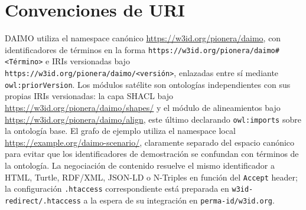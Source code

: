 \documentclass[11pt,a4paper]{article}
\newcommand{\code}[1]{\texttt{#1}}
\begin{document}
\section{Convenciones de URI}\label{app:uris}

DAIMO utiliza el namespace canónico \url{https://w3id.org/pionera/daimo}, con identificadores de términos en la forma \texttt{https://w3id.org/pionera/daimo\#<Término>} e IRIs versionadas bajo \texttt{https://w3id.org/pionera/daimo/<versión>}, enlazadas entre sí mediante \code{owl:priorVersion}. Los módulos satélite son ontologías independientes con sus propias IRIs versionadas: la capa SHACL bajo \url{https://w3id.org/pionera/daimo/shapes/} y el módulo de alineamientos bajo \url{https://w3id.org/pionera/daimo/align}, este último declarando \code{owl:imports} sobre la ontología base. El grafo de ejemplo utiliza el namespace local \url{https://example.org/daimo-scenario/}, claramente separado del espacio canónico para evitar que los identificadores de demostración se confundan con términos de la ontología. La negociación de contenido resuelve el mismo identificador a HTML, Turtle, RDF/XML, JSON-LD o N-Triples en función del \texttt{Accept} header; la configuración \code{.htaccess} correspondiente está preparada en \code{w3id-redirect/.htaccess} a la espera de su integración en \code{perma-id/w3id.org}.
\end{document}

